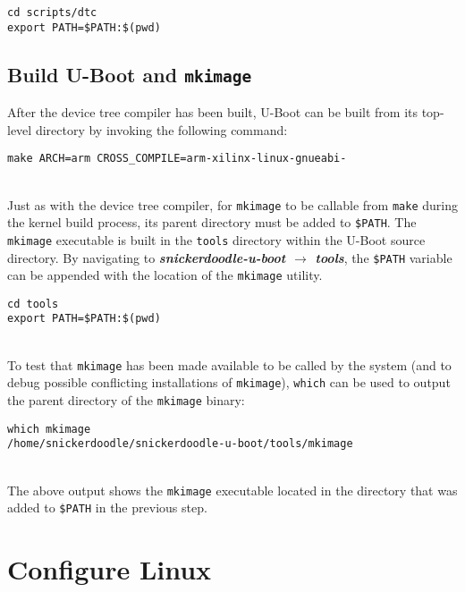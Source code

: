 \begin{lstlisting}[style=text]
cd scripts/dtc
export PATH=$PATH:$(pwd)
\end{lstlisting}

\subsection{Build U-Boot and \texttt{mkimage}}

After the device tree compiler has been built, U-Boot can be built from its top-level directory by invoking the following command: \\

\begin{lstlisting}[style=text]
make ARCH=arm CROSS_COMPILE=arm-xilinx-linux-gnueabi- 
\end{lstlisting}

~\\
\noindent
Just as with the device tree compiler, for \texttt{mkimage} to be callable from \texttt{make} during the kernel build process, its parent directory must be added to \texttt{\$PATH}. The \texttt{mkimage} executable is built in the \texttt{tools} directory within the U-Boot source directory. By navigating to \textit{\bfseries snickerdoodle-u-boot $\rightarrow$ tools}, the \texttt{\$PATH} variable can be appended with the location of the \texttt{mkimage} utility. \\

\begin{lstlisting}
cd tools
export PATH=$PATH:$(pwd)
\end{lstlisting}

~\\
\noindent
To test that \texttt{mkimage} has been made available to be called by the system (and to debug possible conflicting installations of \texttt{mkimage}), \texttt{which} can be used to output the parent directory of the \texttt{mkimage} binary: \\

\begin{lstlisting}[style=text] which mkimage
/home/snickerdoodle/snickerdoodle-u-boot/tools/mkimage
\end{lstlisting}

~\\
\noindent
The above output shows the \texttt{mkimage} executable located in the directory that was added to \texttt{\$PATH} in the previous step.


\section{Configure Linux}

